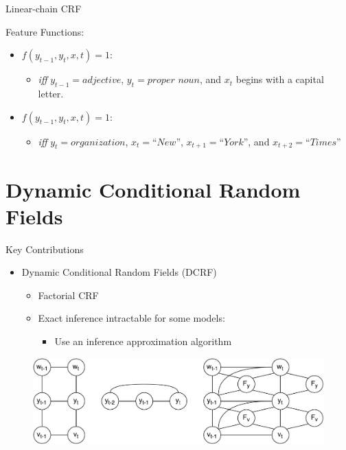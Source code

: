 \documentclass[presentation,bigger]{beamer}
\begin{document}
\begin{frame}[label={sec:orgheadline9}]{Linear-chain CRF}
\begin{block}{Feature Functions:}
\begin{itemize}
\item \(f(y_{t-1}, y_t, x, t) = 1\):
\begin{itemize}
\item \emph{iff} \(y_{t-1} = adjective\), \(y_t = \textit{proper noun}\), and \(x_t\) begins with a capital letter.
\end{itemize}
\item \(f(y_{t-1}, y_t, x, t) = 1\):
\begin{itemize}
\item \emph{iff} \(y_t = \textit{organization}\), \(x_{t} = \textit{``New''}\), \(x_{t+1} = \textit{``York''}\), and \(x_{t+2} = \textit{``Times''}\)
\end{itemize}
\end{itemize}
\end{block}
\end{frame}
\section{Dynamic Conditional Random Fields}
\label{sec:orgheadline21}
\begin{frame}[label={sec:orgheadline11}]{Key Contributions}
\begin{itemize}
\item Dynamic Conditional Random Fields (DCRF)
\begin{itemize}
\item Factorial CRF
\item Exact inference intractable for some models:
\begin{itemize}
\item Use an inference approximation algorithm
\end{itemize}
\end{itemize}
\end{itemize}
\begin{figure}[htb]
\centering
\includegraphics[width=\textwidth]{figures/DCRF.pdf}
\end{figure}
\end{frame}
\end{document}
